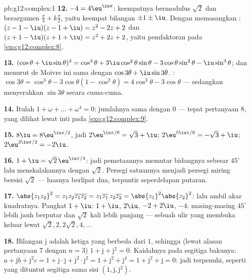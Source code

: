 \begin{solution}{pb:g12:complex:1}
\textbf{12.} $-4 = 4\eu^{\iu\pi}$:  keempatnya bermodulus
$\sqrt2$ dan berargumen
$\frac{\pi}{4} + k\frac{\pi}{2}$, yaitu keempat bilangan
$\pm 1 \pm \iu$. Dengan memasangkan :
$(z - 1 - \iu)(z - 1 + \iu) = z^2 - 2z + 2$ dan
$(z + 1 - \iu)(z + 1 + \iu) = z^2 + 2z + 2$, yaitu
pemfaktoran pada \cref{exo:g12:complex:8}.

\textbf{13.} $(\cos\theta + \iu\sin\theta)^3 = \cos^3\theta +
3\iu\cos^2\theta\sin\theta - 3\cos\theta\sin^2\theta -
\iu\sin^3\theta$; dan menurut de Moivre ini sama dengan
$\cos 3\theta + \iu \sin 3\theta$. :
$\cos 3\theta = \cos^3\theta - 3\cos\theta(1 - \cos^2\theta)
= 4\cos^3\theta - 3\cos\theta$ --- sedangkan 
menyerahkan $\sin 3\theta$ secara cuma-cuma.

\textbf{14.} Itulah 
$1 + \omega + \dots + \omega^4 = 0$: jumlahnya sama dengan $0$ ---
tepat pertanyaan 8, yang dilihat lewat
inti pada \cref{exo:g12:complex:9}.

\textbf{15.} $8\iu = 8\eu^{\iu\pi/2}$, jadi 
$2\eu^{\iu\pi/6} = \sqrt3 + \iu$;
$2\eu^{5\iu\pi/6} = -\sqrt3 + \iu$;
$2\eu^{3\iu\pi/2} = -2\iu$.

\textbf{16.} $1 + \iu = \sqrt2\,\eu^{\iu\pi/4}$: jadi pemetaannya
memutar bidangnya sebesar $45^\circ$ lalu menskalakannya dengan $\sqrt2$.
Persegi satuannya menjadi persegi miring bersisi $\sqrt2$ ---
luasnya berlipat dua, terpuntir seperdelapan putaran.

\textbf{17.} $\abs{z_1 z_2}^2 = z_1 z_2 \overline{z_1 z_2} =
z_1\overline{z_1}\, z_2\overline{z_2} =
\abs{z_1}^2\abs{z_2}^2$: lalu ambil akar kuadratnya. Pangkat
$1 + \iu$: $1 + \iu$, $2\iu$, $-2 + 2\iu$, $-4$: masing-masing
$45^\circ$ lebih jauh berputar dan $\sqrt2$ kali lebih panjang --- sebuah
ulir yang membuka keluar lewat 
$\sqrt2, 2, 2\sqrt2, 4, \dots$

\textbf{18.} Bilangan $\mathrm{j}$ adalah  ketiga
yang berbeda dari $1$, sehingga (lewat alasan pertanyaan 7 dengan $n = 3$)
$1 + \mathrm{j} + \mathrm{j}^2 = 0$. Kaidahnya pada segitiga
bakunya: $a + \mathrm{j}b + \mathrm{j}^2 c = 1 +
\mathrm{j}\cdot\mathrm{j} + \mathrm{j}^2 \cdot \mathrm{j}^2 =
1 + \mathrm{j}^2 + \mathrm{j}^4 = 1 + \mathrm{j}^2 +
\mathrm{j} = 0$: jadi terpenuhi, seperti yang dituntut segitiga sama sisi
$\left(1, \mathrm{j}, \mathrm{j}^2\right)$.


\end{solution}
